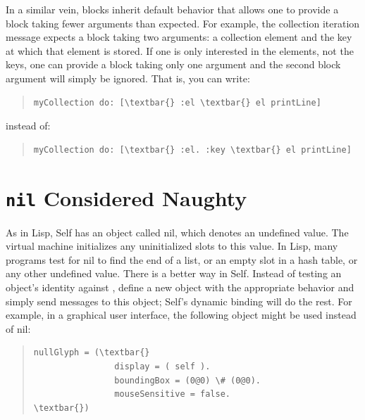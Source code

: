 \documentclass[letterpaper,10pt,english]{sphinxmanual}
\begin{document}
In a similar vein, blocks inherit default behavior that allows one to provide a block taking fewer
arguments than expected. For example, the collection iteration message  expects a block taking
two arguments: a collection element and the key at which that element is stored. If one is only
interested in the elements, not the keys, one can provide a block taking only one argument and the
second block argument will simply be ignored. That is, you can write:
\begin{quote}

\begin{Verbatim}[commandchars=\\\{\}]
myCollection do: [\textbar{} :el \textbar{} el printLine]
\end{Verbatim}
\end{quote}

instead of:
\begin{quote}

\begin{Verbatim}[commandchars=\\\{\}]
myCollection do: [\textbar{} :el. :key \textbar{} el printLine]
\end{Verbatim}
\end{quote}


\section{\texttt{nil} Considered Naughty}
\label{progguid:nil-considered-naughty}
As in Lisp, Self has an object called nil, which denotes an undefined value. The virtual machine
initializes any uninitialized slots to this value. In Lisp, many programs test for nil to find the end
of a list, or an empty slot in a hash table, or any other undefined value. There is a better way in
Self. Instead of testing an object’s identity against , define a new object with the appropriate
behavior and simply send messages to this object; Self’s dynamic binding will do the rest. For example,
in a graphical user interface, the following object might be used instead of nil:
\begin{quote}

\begin{Verbatim}[commandchars=\\\{\}]
nullGlyph = (\textbar{}
                display = ( self ).
                boundingBox = (0@0) \# (0@0).
                mouseSensitive = false.
\textbar{})
\end{Verbatim}
\end{quote}
\end{document}
